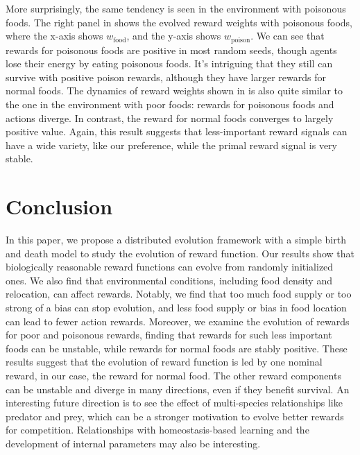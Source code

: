 More surprisingly, the same tendency is seen in the environment with poisonous foods. The right panel in  shows the evolved reward weights with poisonous foods, where the x-axis shows $w_{\mathrm{food}}$, and the y-axis shows $w_{\mathrm{poison}}$. We can see that rewards for poisonous foods are positive in most random seeds, though agents lose their energy by eating poisonous foods. It's intriguing that they still can survive with positive poison rewards, although they have larger rewards for normal foods. The dynamics of reward weights shown in  is also quite similar to the one in the environment with poor foods: rewards for poisonous foods and actions diverge. In contrast, the reward for normal foods converges to largely positive value. Again, this result suggests that less-important reward signals can have a wide variety, like our preference, while the primal reward signal is very stable.

\section{Conclusion}
In this paper, we propose a distributed evolution framework with a simple birth and death model to study the evolution of reward function. Our results show that biologically reasonable reward functions can evolve from randomly initialized ones. We also find that environmental conditions, including food density and relocation, can affect rewards. Notably, we find that too much food supply or too strong of a bias can stop evolution, and less food supply or bias in food location can lead to fewer action rewards. Moreover, we examine the evolution of rewards for poor and poisonous rewards, finding that rewards for such less important foods can be unstable, while rewards for normal foods are stably positive. These results suggest that the evolution of reward function is led by one nominal reward, in our case, the reward for normal food. The other reward components can be unstable and diverge in many directions, even if they benefit survival.  An interesting future direction is to see the effect of multi-species relationships like predator and prey, which can be a stronger motivation to evolve better rewards for competition. Relationships with homeostasis-based learning \citep{yoshidaEmergenceIntegratedBehaviors2024} and the development of internal parameters may also be interesting.